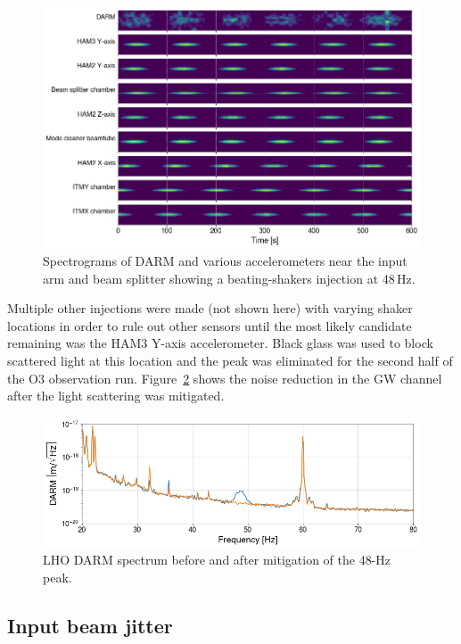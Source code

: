 \begin{figure}[h!]
	\centering
	\includegraphics[width=\textwidth]{figures/noise-studies/vib-beat-spectrograms.png}
	\caption{
		Spectrograms of DARM and various accelerometers near the input arm and beam splitter showing a beating-shakers injection at 48\,Hz.}
	\label{fig:vib-beat-spectrograms}
\end{figure}

Multiple other injections were made (not shown here) with varying shaker locations in order to rule out other sensors until the most likely candidate remaining was the HAM3 Y-axis accelerometer.
Black glass was used to block scattered light at this location and the peak was eliminated for the second half of the O3 observation run.
Figure~\ref{fig:vib-48hz} shows the noise reduction in the \ac{GW} channel after the light scattering was mitigated.

\begin{figure}
	\centering
	\includegraphics[width=\textwidth]{figures/noise-studies/vib-48Hz.png}
	\caption{LHO DARM spectrum before and after mitigation of the 48-Hz peak.}
	\label{fig:vib-48hz}
\end{figure}

\subsection{Input beam jitter}\label{sec:vib-jitter}

